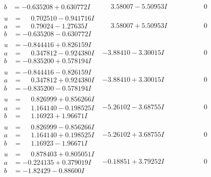 \documentclass[1p]{elsarticle_modified}
\theoremstyle{definition}
\begin{document}
$$\begin{array}{c|c|c}
\begin{aligned}
b &= -0.635208 + 0.630772 I\end{aligned}
 & \phantom{-}3.58007 - 5.50953 I & \phantom{-0.000000 } 0 \\ \hline\begin{aligned}
u &= \phantom{-}0.702510 - 0.941716 I \\
a &= \phantom{-}0.79024 - 1.27635 I \\
b &= -0.635208 - 0.630772 I\end{aligned}
 & \phantom{-}3.58007 + 5.50953 I & \phantom{-0.000000 } 0 \\ \hline\begin{aligned}
u &= -0.844416 + 0.826159 I \\
a &= \phantom{-}0.347812 - 0.924380 I \\
b &= -0.835200 + 0.578194 I\end{aligned}
 & -3.88410 - 3.30015 I & \phantom{-0.000000 } 0 \\ \hline\begin{aligned}
u &= -0.844416 - 0.826159 I \\
a &= \phantom{-}0.347812 + 0.924380 I \\
b &= -0.835200 - 0.578194 I\end{aligned}
 & -3.88410 + 3.30015 I & \phantom{-0.000000 } 0 \\ \hline\begin{aligned}
u &= \phantom{-}0.826999 + 0.856266 I \\
a &= \phantom{-}1.164140 - 0.198525 I \\
b &= \phantom{-}1.16923 + 1.96671 I\end{aligned}
 & -5.26102 - 3.68755 I & \phantom{-0.000000 } 0 \\ \hline\begin{aligned}
u &= \phantom{-}0.826999 - 0.856266 I \\
a &= \phantom{-}1.164140 + 0.198525 I \\
b &= \phantom{-}1.16923 - 1.96671 I\end{aligned}
 & -5.26102 + 3.68755 I & \phantom{-0.000000 } 0 \\ \hline\begin{aligned}
u &= \phantom{-}0.878403 + 0.805051 I \\
a &= -0.224135 + 0.379019 I \\
b &= -1.82429 - 0.88600 I\end{aligned}
 & -0.18851 + 3.79252 I & \phantom{-0.000000 } 0 \\ \hline\begin{aligned}

\end{aligned}
\end{array}$$
\end{document}

